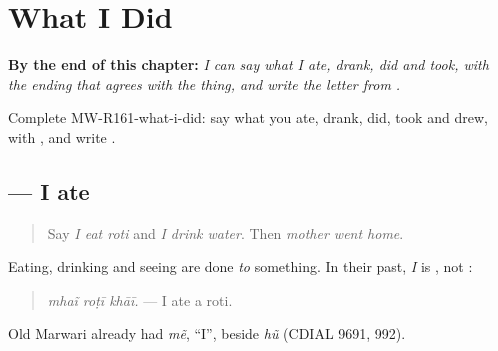 
\chapter{What I Did}
\label{ch:mw-a2-what-i-did}

\begin{chapteropening}
\textbf{By the end of this chapter:} \emph{I can say what I ate, drank, did and took, with the ending that agrees with the thing, and write the letter  from .}

Complete MW-R161-what-i-did: say what you ate, drank, did, took and drew, with , and write .
\end{chapteropening}

\section[\texorpdfstring{\mw{म्हैं} \mw{रोटी} \mw{खाई।} (mhaĩ roṭī khāī.)}{म्हैं रोटी खाई। (mhaĩ roṭī khāī.)}]{   — I ate}

\label{lesson:MW-C161-mhai}



\begin{quote}
Say \emph{I eat roti} and \emph{I drink water}. Then \emph{mother went home}.
\end{quote}

\begin{grammarlens}[title={Grammar Lens: \mw{म्हैं}}]
Eating, drinking and seeing are done \emph{to} something. In their past, \emph{I} is \textbf{}, not \textbf{}:

\begin{quote}
\textbf{  }
\end{quote}

\begin{quote}
\emph{mhaĩ roṭī khāī.} — I ate a roti.
\end{quote}

Old Marwari already had \emph{mẽ}, \textquotedblleft{}I\textquotedblright{}, beside \emph{hũ} (CDIAL 9691, 992).
\end{grammarlens}

